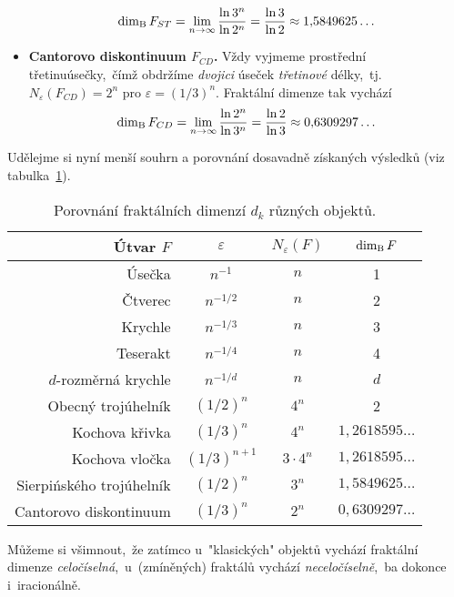 \begin{itemize}
    \begin{equation}\label{eq:sierpinskeho-trojuhelnik-dimenze}
        \operatorname{dim_B}{F_{ST}}=\lim_{n\to\infty}{\dfrac{\ln{3^n}}{\ln{2^{n}}}}=\dfrac{\ln{3}}{\ln{2}}\approx 1{,}5849625\dots
    \end{equation}
    \item \textbf{Cantorovo diskontinuum $F_{CD}$.} Vždy vyjmeme prostřední třetinu\linebreak{}úsečky,~čímž obdržíme \emph{dvojici} úseček \emph{třetinové} délky,~tj. $N_\varepsilon(F_{CD})=2^n$ pro $\varepsilon=(1/3)^n$. Fraktální dimenze tak vychází
    \begin{equation}\label{eq:cantorovo-diskontinuum-dimenze}
        \operatorname{dim_B}{F_{CD}}=\lim_{n\to\infty}{\dfrac{\ln{2^n}}{\ln{3^n}}}=\dfrac{\ln{2}}{\ln{3}}\approx 0{,}6309297\dots
    \end{equation}
\end{itemize}
Udělejme si nyní menší souhrn a porovnání dosavadně získaných výsledků (viz tabulka~\ref{table:fraktaly-eukleides-dimenze}).
\begin{table}[h]
    \centering
    \begin{tabular}{r|ccc}
        Útvar $F$                & $\varepsilon$ & $N_\varepsilon(F)$ & $\operatorname{dim_B}{F}$         \\ \hline
        Úsečka                   & $n^{-1}$      & $n$                & 1                  \\
        Čtverec                  & $n^{-1/2}$    & $n$                & 2                  \\
        Krychle                  & $n^{-1/3}$    & $n$                & 3                  \\
        Teserakt                 & $n^{-1/4}$    & $n$                & 4                  \\
        $d$-rozměrná krychle     & $n^{-1/d}$    & $n$                & $d$                \\
        Obecný trojúhelník       & $(1/2)^n$     & $4^n$              & 2                  \\
        Kochova křivka           & $(1/3)^n$     & $4^n$              & $1{,}2618595\dots$ \\
        Kochova vločka           & $(1/3)^{n+1}$ & $3\cdot 4^n$       & $1{,}2618595\dots$ \\
        Sierpińského trojúhelník & $(1/2)^n$     & $3^n$              & $1{,}5849625\dots$ \\
        Cantorovo diskontinuum   & $(1/3)^n$     & $2^n$              & $0{,}6309297\dots$ \\
    \end{tabular}
    \caption{Porovnání fraktálních dimenzí $d_k$ různých objektů.}
    \label{table:fraktaly-eukleides-dimenze}
\end{table}
Můžeme si všimnout,~že zatímco u~"klasických" objektů vychází fraktální dimenze \emph{celočíselná},~u~(zmíněných) fraktálů vychází \emph{neceločíselně},~ba dokonce i~iracionálně.

